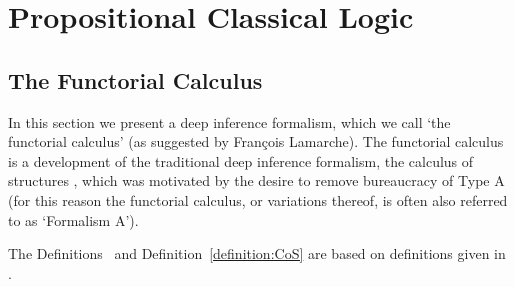 \chapter{Propositional Classical Logic}\label{chapter:PropositionalClassicalLogic}

\section{The Functorial Calculus}\label{section:FunctorialCalculus}

In this section we present a deep inference formalism, which we call `the functorial calculus' (as suggested by Fran\c{c}ois Lamarche). The functorial calculus is a development of the traditional deep inference formalism, the calculus of structures \cite{}, which was motivated by the desire to remove bureaucracy of Type A \cite{} (for this reason the functorial calculus, or variations thereof, is often also referred to as `Formalism A').


The Definitions~ and Definition~\vref{definition:CoS} are based on definitions given in \cite{}.


\newcommand{\fff}{\mathsf f}
\newcommand{\ttt}{\mathsf t}
\newcommand{\size}[1]{{\left\vert #1\right\vert}}\vlupdate\size

